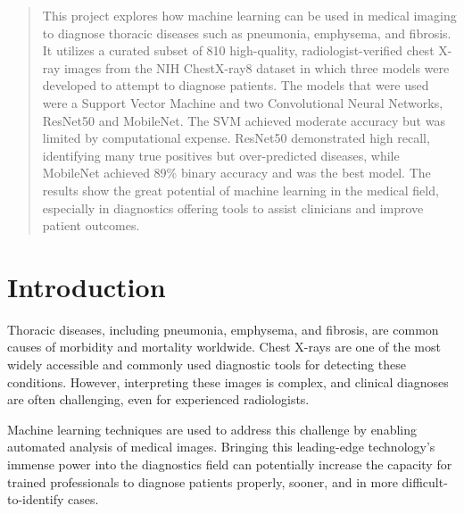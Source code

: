 \documentclass{article}
\theoremstyle{plain}
\theoremstyle{definition}
\theoremstyle{remark}
\begin{document}


\begin{abstract}

This project explores how machine learning can be used in medical imaging to diagnose thoracic
diseases such as pneumonia, emphysema, and fibrosis. It utilizes a curated subset of 810
high-quality, radiologist-verified chest X-ray images from the NIH ChestX-ray8 dataset in which
three models were developed to attempt to diagnose patients. The models that were used were a Support
Vector Machine and two Convolutional Neural Networks, ResNet50 and MobileNet. The SVM achieved
moderate accuracy but was limited by computational expense. ResNet50 demonstrated high recall,
identifying many true positives but over-predicted diseases, while MobileNet achieved 89\% binary
accuracy and was the best model. The results show the great potential of machine learning in the
medical field, especially in diagnostics offering tools to assist clinicians and improve patient
outcomes.

\end{abstract}


\section{Introduction}
Thoracic diseases, including pneumonia, emphysema, and fibrosis, are common causes of morbidity and
mortality worldwide. Chest X-rays are one of the most widely accessible and commonly used diagnostic
tools for detecting these conditions. However, interpreting these images is complex, and clinical
diagnoses are often challenging, even for experienced radiologists.

Machine learning techniques are used to address this challenge by enabling automated analysis of
medical images. Bringing this leading-edge technology's immense power into the diagnostics field can
potentially increase the capacity for trained professionals to diagnose patients properly, sooner,
and in more difficult-to-identify cases.
\end{document}
